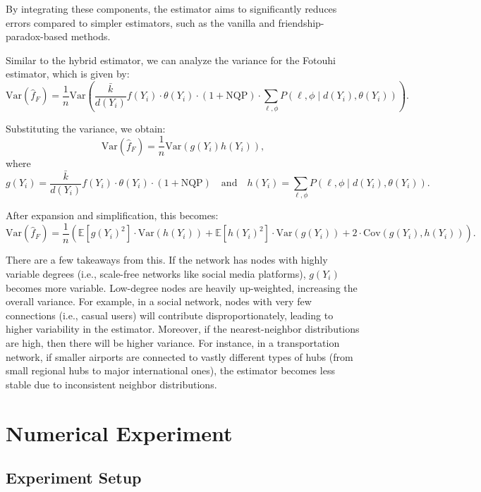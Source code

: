 \documentclass{article}
\begin{document}
By integrating these components, the estimator aims to significantly reduces errors compared to simpler estimators, such as the vanilla and friendship-paradox-based methods.

Similar to the hybrid estimator, we can analyze the variance for the Fotouhi estimator, which is given by:
\[
\text{Var}(\hat{f}_{F}) = \frac{1}{n} \text{Var}\left( \frac{\bar{k}}{d(Y_i)} f(Y_i) \cdot \theta(Y_i) \cdot (1 + \text{NQP}) \cdot \sum_{\ell, \phi} P(\ell, \phi \mid d(Y_i), \theta(Y_i)) \right).
\]

\noindent Substituting the variance, we obtain:
\[
\text{Var}(\hat{f}_{F}) = \frac{1}{n} \text{Var}(g(Y_i) h(Y_i)),
\]
where 
\[
g(Y_i) = \frac{\bar{k}}{d(Y_i)} f(Y_i) \cdot \theta(Y_i) \cdot (1 + \text{NQP}) \quad \text{and} \quad
h(Y_i) = \sum_{\ell, \phi} P(\ell, \phi \mid d(Y_i), \theta(Y_i)).
\]

\noindent After expansion and simplification, this becomes:
\[
\text{Var}(\hat{f}_{F}) = \frac{1}{n} \left( \mathbb{E}[g(Y_i)^2] \cdot \text{Var}(h(Y_i)) + \mathbb{E}[h(Y_i)^2] \cdot \text{Var}(g(Y_i)) + 2 \cdot \text{Cov}(g(Y_i), h(Y_i)) \right).
\]

There are a few takeaways from this. If the network has nodes with highly variable degrees (i.e., scale-free networks like social media platforms), \(g(Y_i)\) becomes more variable. Low-degree nodes are heavily up-weighted, increasing the overall variance. For example, in a social network, nodes with very few connections (i.e., casual users) will contribute disproportionately, leading to higher variability in the estimator. Moreover, if the nearest-neighbor distributions are high, then there will be higher variance. For instance, in a transportation network, if smaller airports are connected to vastly different types of hubs (from small regional hubs to major international ones), the estimator becomes less stable due to inconsistent neighbor distributions.

\section{Numerical Experiment}
\begingroup
\titlespacing*{\subsection}{0pt}{1ex}{1ex} %

\subsection{Experiment Setup}
\end{document}
